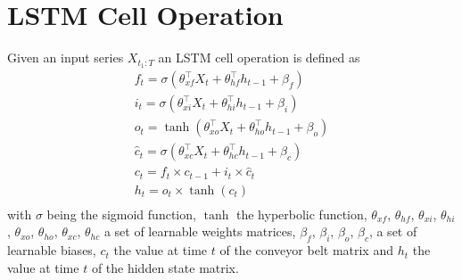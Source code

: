 \section{LSTM Cell Operation}
Given an input series $X_{t_1:T}$ an LSTM cell operation is defined as
\begin{gather}
    \label{lstm}
    f_t = \sigma(\theta_{xf}^\top X_t + \theta_{hf}^\top h_{t-1} + \beta_f) \\ \nonumber
    i_t = \sigma(\theta_{xi}^\top X_t + \theta_{hi}^\top h_{t-1} + \beta_i) \\ \nonumber
    o_t = \tanh(\theta_{xo}^\top X_t + \theta_{ho}^\top h_{t-1} + \beta_o) \\ \nonumber
    \widehat{c}_t = \sigma(\theta_{xc}^\top X_t + \theta_{hc}^\top h_{t-1} + \beta_c) \\ \nonumber
    c_t = f_t \times c_{t-1} + i_t \times \widehat{c}_t \\ \nonumber
    h_t = o_t \times \tanh(c_t) \\ \nonumber
\end{gather}
with $\sigma$  being the sigmoid function, $\tanh$ the hyperbolic function, $\theta_{xf}$, $\theta_{hf}$, $\theta_{xi}$, $\theta_{hi}$, $\theta_{xo}$, $\theta_{ho}$, $\theta_{xc}$, $\theta_{hc}$ a set of learnable weights matrices, $\beta_f$, $\beta_i$, $\beta_o$, $\beta_c$, a set of learnable biases, $c_t$ the value at time $t$ of the conveyor belt matrix and $h_t$ the value at time $t$ of the hidden state matrix.

